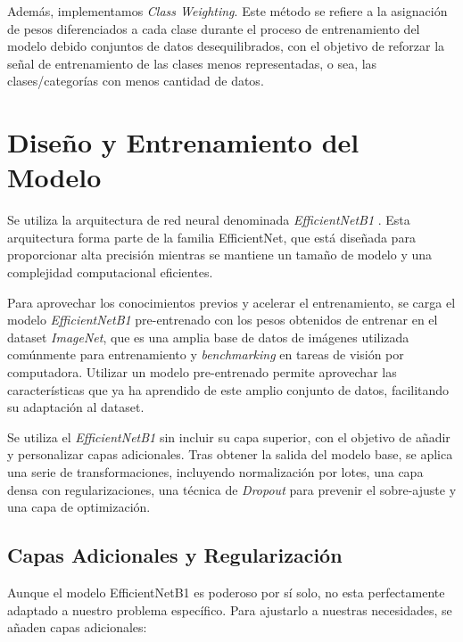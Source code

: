 Además, implementamos \textit{Class Weighting}. Este método se refiere a la asignación de pesos diferenciados a cada clase durante el proceso de entrenamiento del modelo debido conjuntos de datos desequilibrados, con el objetivo de reforzar la señal de entrenamiento de las clases menos representadas, o sea, las clases/categorías con menos cantidad de datos.

\section{Diseño y Entrenamiento del Modelo}

Se utiliza la arquitectura de red neural denominada \textit{EfficientNetB1} \cite{efficientnet} . Esta arquitectura forma parte de la familia EfficientNet, 
que está diseñada para proporcionar alta precisión mientras se mantiene un tamaño de modelo y una complejidad computacional eficientes.

Para aprovechar los conocimientos previos y acelerar el entrenamiento, se carga el modelo \textit{EfficientNetB1} pre-entrenado con los pesos obtenidos de entrenar en el dataset \textit{ImageNet}, que es una amplia base de datos de imágenes utilizada comúnmente para entrenamiento y \textit{benchmarking} en tareas de visión por computadora. Utilizar un modelo pre-entrenado permite aprovechar las características que ya ha aprendido de este amplio conjunto de datos, facilitando su adaptación al dataset.

Se utiliza el \textit{EfficientNetB1} sin incluir su capa superior, con el objetivo de añadir y personalizar capas adicionales. Tras obtener la salida del modelo base, se aplica una serie de transformaciones, incluyendo normalización por lotes, una capa densa con regularizaciones, una técnica de \textit{Dropout} para prevenir el sobre-ajuste y una capa de optimización. 

\subsection{Capas Adicionales y Regularización}

Aunque el modelo EfficientNetB1 es poderoso por sí solo, no esta perfectamente adaptado a nuestro problema específico. Para ajustarlo a nuestras necesidades, se añaden capas adicionales:

